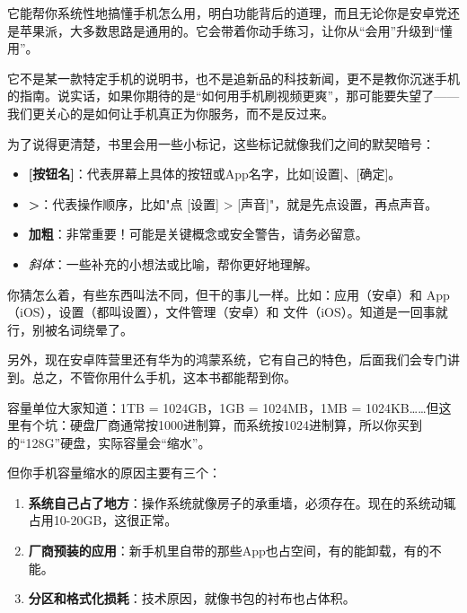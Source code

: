 


它能帮你系统性地搞懂手机怎么用，明白功能背后的道理，而且无论你是安卓党还是苹果派，大多数思路是通用的。它会带着你动手练习，让你从“会用”升级到“懂用”。

它不是某一款特定手机的说明书，也不是追新品的科技新闻，更不是教你沉迷手机的指南。说实话，如果你期待的是“如何用手机刷视频更爽”，那可能要失望了——我们更关心的是如何让手机真正为你服务，而不是反过来。


为了说得更清楚，书里会用一些小标记，这些标记就像我们之间的默契暗号：

\begin{itemize}
  \item \textbf{[按钮名]}：代表屏幕上具体的按钮或App名字，比如[设置]、[确定]。
  \item \textbf{>}：代表操作顺序，比如"点 [设置] > [声音]"，就是先点设置，再点声音。
  \item \textbf{加粗}：非常重要！可能是关键概念或安全警告，请务必留意。
  \item \emph{斜体}：一些补充的小想法或比喻，帮你更好地理解。
\end{itemize}


你猜怎么着，有些东西叫法不同，但干的事儿一样。比如：应用（安卓）和 App（iOS），设置（都叫设置），文件管理（安卓）和 文件（iOS）。知道是一回事就行，别被名词绕晕了。

另外，现在安卓阵营里还有华为的鸿蒙系统，它有自己的特色，后面我们会专门讲到。总之，不管你用什么手机，这本书都能帮到你。


容量单位大家知道：1TB = 1024GB，1GB = 1024MB，1MB = 1024KB……但这里有个坑：硬盘厂商通常按1000进制算，而系统按1024进制算，所以你买到的“128G”硬盘，实际容量会“缩水”。

但你手机容量缩水的原因主要有三个：

\begin{enumerate}
  \item \textbf{系统自己占了地方}：操作系统就像房子的承重墙，必须存在。现在的系统动辄占用10-20GB，这很正常。
  \item \textbf{厂商预装的应用}：新手机里自带的那些App也占空间，有的能卸载，有的不能。
  \item \textbf{分区和格式化损耗}：技术原因，就像书包的衬布也占体积。
\end{enumerate}

